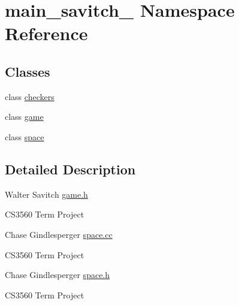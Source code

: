\hypertarget{namespacemain__savitch__14}{}\section{main\+\_\+savitch\+\_ Namespace Reference}
\label{namespacemain__savitch__14}
\subsection*{Classes}
\begin{DoxyCompactItemize}
\item 
class \hyperlink{classmain__savitch__14_1_1checkers}{checkers}
\item 
class \hyperlink{classmain__savitch__14_1_1game}{game}
\item 
class \hyperlink{classmain__savitch__14_1_1space}{space}
\end{DoxyCompactItemize}


\subsection{Detailed Description}
Walter Savitch \hyperlink{game_8h}{game.\+h}

C\+S3560 Term Project

Chase Gindlesperger \hyperlink{space_8cc}{space.\+cc}

C\+S3560 Term Project

Chase Gindlesperger \hyperlink{space_8h}{space.\+h}

C\+S3560 Term Project 